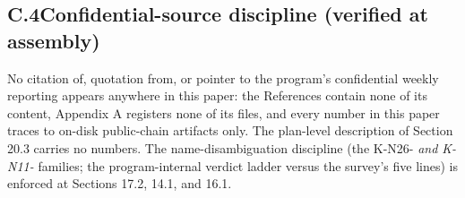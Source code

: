 \documentclass[11pt]{article}
\begin{document}
\subsection*{C.4\quad Confidential-source discipline (verified at assembly)}
\noindent No citation of, quotation from, or pointer to the program's confidential weekly reporting appears anywhere in this paper: the References contain none of its content, Appendix A registers none of its files, and every number in this paper traces to on-disk public-chain artifacts only. The plan-level description of Section 20.3 carries no numbers. The name-disambiguation discipline (the K-N26-\emph{ and K-N11-} families; the program-internal verdict ladder versus the survey's five lines) is enforced at Sections 17.2, 14.1, and 16.1.\par
\end{document}
